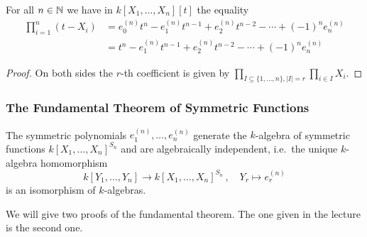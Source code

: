 \begin{lemma}
  \label{lemma: natural occurence of elementary symmetric polynomials}
  For all $n \in \mathbb{N}$ we have in $k[X_1, \dotsc, X_n][t]$ the equality
  \begin{align*}
        \prod_{i=1}^n (t-X_i)
    &=    e^{(n)}_0 t^n
        - e^{(n)}_1 t^{n-1}
        + e^{(n)}_2 t^{n-2}
        - \dotsb
        + (-1)^n e^{(n)}_n  \\
    &=    t^n
        - e^{(n)}_1 t^{n-1}
        + e^{(n)}_2 t^{n-2}
        - \dotsb
        + (-1)^n e^{(n)}_n
  \end{align*}
\end{lemma}
\begin{proof}
  On both sides the $r$-th coefficient is given by $\prod_{I \subseteq \{1, \dotsc, n\}, |I| = r} \prod_{i \in I} X_i $.
\end{proof}


\subsubsection{The Fundamental Theorem of Symmetric Functions}


\begin{theorem}
  The symmetric polynomials $e^{(n)}_1, \dotsc, e^{(n)}_n$ generate the $k$-algebra of symmetric functions $k[X_1, \dotsc, X_n]^{S_n}$ and are algebraically independent, i.e.\ the unique $k$-algebra homomorphism
  \[
            k[Y_1, \dotsc, Y_n]
    \to     k[X_1, \dotsc, X_n]^{S_n} \,,
    \quad   Y_r
    \mapsto e^{(n)}_r
  \]
  is an isomorphism of $k$-algebras.
\end{theorem}


\begin{fluff}
  We will give two proofs of the fundamental theorem.
  The one given in the lecture is the second one.
\end{fluff}


